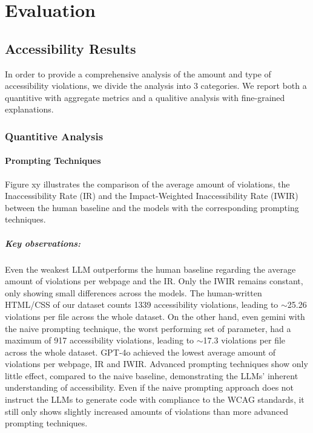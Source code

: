 \chapter{Evaluation}\label{chapter:Evaluation}


\section{Accessibility Results}
In order to provide a comprehensive analysis of the amount and type of accessibility violations, 
we divide the analysis into 3 categories. We report both a quantitive with aggregate 
metrics and a qualitive analysis with fine-grained explanations.

\subsection{Quantitive Analysis}
\subsubsection{Prompting Techniques}
Figure xy illustrates the comparison of the average amount of violations, the
Inaccessibility Rate (IR) and the Impact-Weighted Inaccessibility Rate (IWIR) between 
the human baseline and the models with the corresponding prompting techniques.

\paragraph{Key observations:}
Even the weakest LLM outperforms the human baseline regarding the average amount
of violations per webpage and the IR. Only the IWIR remains constant, only showing small 
differences across the models. The human-written HTML/CSS of our dataset counts 1339 accessibility 
violations, leading to $\sim$25.26 violations per file across the whole dataset.
On the other hand, even gemini with the naive prompting technique,
the worst performing set of parameter, had a maximum of 917 accessibility 
violations, leading to $\sim$17.3 violations per file across the whole dataset.\newline
GPT‑4o achieved the lowest average amount of violations per webpage, IR and IWIR.\newline
Advanced prompting techniques show only little effect, compared to the naive baseline, 
demonstrating the LLMs' inherent understanding of accessibility. 
Even if the naive prompting approach does not instruct the LLMs to generate
code with compliance to the WCAG standards, it still only shows slightly 
increased amounts of violations than more advanced prompting techniques.

